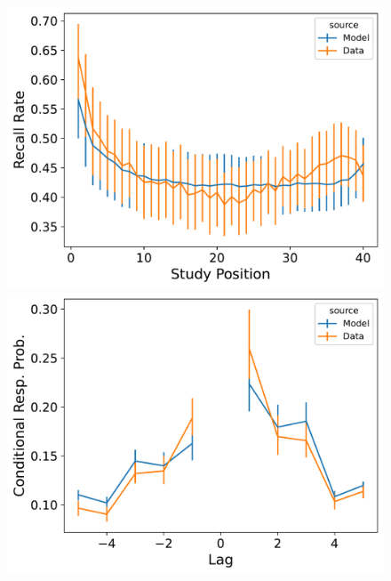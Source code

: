 \documentclass[
  letterpaper,
  11pt,
  english,
  singlespacing,
  headsepline]{MastersDoctoralThesis}
\begin{document}
\begin{figure}
\begin{minipage}{0.33\linewidth}
\includegraphics{icmr_figures/LohnasKahana2014_ConnectionistCMR_Model_Fitting_spc-1.png}\end{minipage}%
\newline
\begin{minipage}{0.33\linewidth}
\includegraphics{icmr_figures/LohnasKahana2014_InstanceCMR_Model_Fitting_crp-1.png}\end{minipage}%
%
\begin{minipage}{0.33\linewidth}

\end{minipage}
\end{figure}
\end{document}
